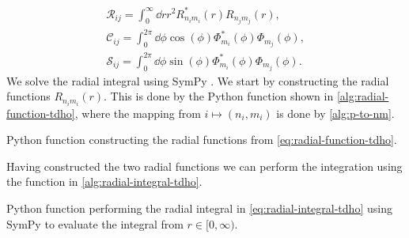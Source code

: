             \begin{gather}
                \mathcal{R}_{ij}
                =
                \int_{0}^{\infty} \dd r r^2
                R_{n_i m_i}^{*}(r) R_{n_j m_j}(r),
                \label{eq:radial-integral-tdho}
                \\
                \mathcal{C}_{ij}
                =
                \int_{0}^{2\pi}
                \dd \phi
                \cos(\phi)
                \Phi_{m_i}^{*}(\phi)
                \Phi_{m_j}(\phi),
                \label{eq:cos-integral-tdho}
                \\
                \mathcal{S}_{ij}
                =
                \int_{0}^{2\pi}
                \dd \phi
                \sin(\phi)
                \Phi_{m_i}^{*}(\phi)
                \Phi_{m_j}(\phi).
                \label{eq:sin-integral-tdho}
            \end{gather}
            We solve the radial integral using SymPy \cite{sympy}.
            We start by constructing the radial functions $R_{n_i m_i}(r)$.
            This is done by the Python function shown in
            \autoref{alg:radial-function-tdho}, where the mapping from $i
            \mapsto (n_i, m_i)$ is done by \autoref{alg:p-to-nm}.
            \begin{algorithm}
                \caption{Python function constructing the radial functions from
                \autoref{eq:radial-function-tdho}.}
                \label{alg:radial-function-tdho}
            \end{algorithm}
            Having constructed the two radial functions we can perform the
            integration using the function in \autoref{alg:radial-integral-tdho}.
            \begin{algorithm}
                \caption{Python function performing the radial integral in
                \autoref{eq:radial-integral-tdho} using SymPy \cite{sympy} to
                evaluate the integral from $r \in [0, \infty)$.}
                \label{alg:radial-integral-tdho}
            \end{algorithm}

